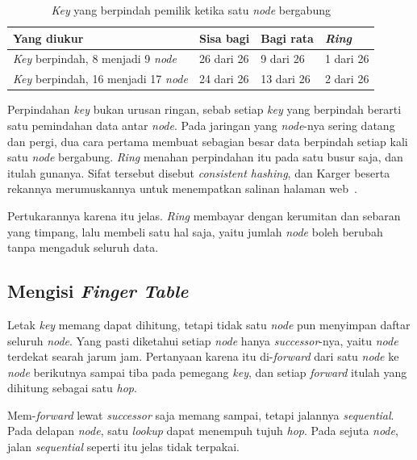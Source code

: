 \begin{table}[htbp]
  \centering
  \caption{\textit{Key} yang berpindah pemilik ketika satu \textit{node} bergabung}
  \label{tab:perpindahan}
  \begin{tabularx}{\textwidth}{|X|l|l|l|}
    \hline
    \textbf{Yang diukur} & \textbf{Sisa bagi} & \textbf{Bagi rata} & \textbf{\textit{Ring}} \\
    \hline
    \textit{Key} berpindah, 8 menjadi 9 \textit{node} & 26 dari 26 & 9 dari 26 & 1 dari 26 \\
    \hline
    \textit{Key} berpindah, 16 menjadi 17 \textit{node} & 24 dari 26 & 13 dari 26 & 2 dari 26 \\
    \hline
  \end{tabularx}
\end{table}

Perpindahan \textit{key} bukan urusan ringan, sebab setiap \textit{key} yang berpindah berarti
satu pemindahan data antar \textit{node}. Pada jaringan yang \textit{node}-nya
sering datang dan pergi, dua cara pertama membuat sebagian besar data berpindah
setiap kali satu \textit{node} bergabung. \textit{Ring} menahan perpindahan itu
pada satu busur saja, dan itulah gunanya. Sifat tersebut disebut
\textit{consistent hashing}, dan Karger beserta rekannya merumuskannya untuk
menempatkan salinan halaman web~\cite{karger1997consistent}.

Pertukarannya karena itu jelas. \textit{Ring} membayar dengan kerumitan dan
sebaran yang timpang, lalu membeli satu hal saja, yaitu jumlah \textit{node}
boleh berubah tanpa mengaduk seluruh data.

\subsection{Mengisi \textit{Finger Table}}

Letak \textit{key} memang dapat dihitung, tetapi tidak satu \textit{node} pun menyimpan
daftar seluruh \textit{node}. Yang pasti diketahui setiap \textit{node} hanya
\textit{successor}-nya, yaitu \textit{node} terdekat searah jarum jam. Pertanyaan karena itu
di-\textit{forward} dari satu \textit{node} ke \textit{node} berikutnya sampai tiba pada
pemegang \textit{key}, dan setiap \textit{forward} itulah yang dihitung sebagai satu
\textit{hop}.

Mem-\textit{forward} lewat \textit{successor} saja memang sampai, tetapi jalannya \textit{sequential}. Pada delapan
\textit{node}, satu \textit{lookup} dapat menempuh tujuh \textit{hop}. Pada
sejuta \textit{node}, jalan \textit{sequential} seperti itu jelas tidak terpakai.

